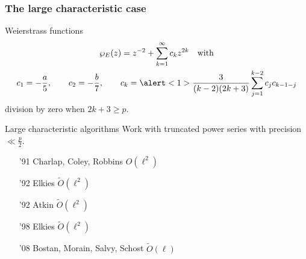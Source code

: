 \documentclass[10pt]{beamer}
\renewcommand{\ge}{\geqslant}  %
\newcommand{\0}{\mathcal{O}}  %
\newcommand{\tildO}{\tilde{O}}  %
\begin{document}
\begin{frame}
  \frametitle{The large characteristic case}

  \vspace{-1mm}
  
  \begin{block}{Weierstrass functions}
    \vspace{-3mm}
    \begin{gather*}
      \wp_E(z) = z^{-2} + \sum_{k=1}^{\infty}c_kz^{2k} \quad\text{with}\\
      c_1 = -\frac{a}{5}, \qquad c_2 = -\frac{b}{7}, 
      \qquad c_k = \alert<1>{\frac{3}{(k-2)(2k+3)}}\sum_{j=1}^{k-2}c_jc_{k-1-j}
    \end{gather*}
    division by zero when $2k+3 \ge p$.
  \end{block}

  \begin{block}{Large characteristic algorithms }
    Work with truncated power series with precision $\ll \frac{p}{2}$.
    \begin{itemize}
    \item['91] Charlap, Coley, Robbins \hfill $O(\ell^2)$
    \item['92] Elkies \hfill $\tildO(\ell^2)$
    \item['92] Atkin \hfill $\tildO(\ell^2)$
    \item['98] Elkies \hfill $\tildO(\ell^2)$
    \item['08] Bostan, Morain, Salvy, Schost \hfill $\tildO(\ell)$
    \end{itemize}
  \end{block}

\end{frame}

\end{document}
